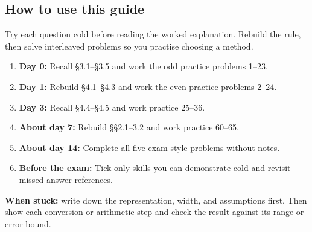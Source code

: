 \documentclass[11pt]{article}
\begin{document}
\begin{keepsection}
\section{How to use this guide}

Try each question cold before reading the worked explanation. Rebuild the rule, then solve interleaved problems so you practise choosing a method.

\begin{enumerate}
\item \textbf{Day 0:} Recall §3.1–§3.5 and work the odd practice problems 1–23.
\item \textbf{Day 1:} Rebuild §4.1–§4.3 and work the even practice problems 2–24.
\item \textbf{Day 3:} Recall §4.4–§4.5 and work practice 25–36.
\item \textbf{About day 7:} Rebuild §§2.1–3.2 and work practice 60–65.
\item \textbf{About day 14:} Complete all five exam-style problems without notes.
\item \textbf{Before the exam:} Tick only skills you can demonstrate cold and revisit missed-answer references.
\end{enumerate}

\begin{notebox}\textbf{When stuck:} write down the representation, width, and assumptions first. Then show each conversion or arithmetic step and check the result against its range or error bound.\end{notebox}
\end{keepsection}
\end{document}
